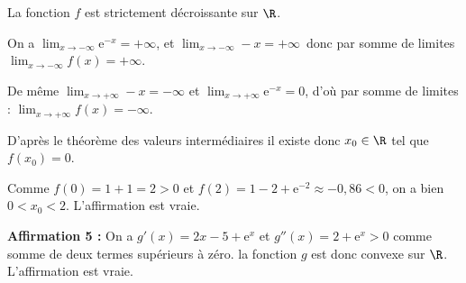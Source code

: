 La fonction $f$ est strictement décroissante sur $\R$.



On a $\displaystyle\lim_{x \to - \infty} \text{e}^{-x} = + \infty$, et $\displaystyle\lim_{x \to - \infty} - x = + \infty$\, donc par somme de limites  $\displaystyle\lim_{x \to - \infty} f(x) = + \infty$.

De même $\displaystyle\lim_{x \to + \infty} - x = - \infty$ et $\displaystyle\lim_{x \to + \infty} \text{e}^{- x} = 0$, d'où par somme de limites : $\displaystyle\lim_{x \to + \infty} f(x) = - \infty$.

D'après le théorème des valeurs intermédiaires il existe donc $x_0 \in \R$ tel que $f\left(x_0\right) = 0$.

Comme $f(0) = 1 + 1 = 2 > 0$ et $f(2) = 1 - 2 + \text{e}^{-2} \approx - 0,86 < 0$, on a bien $0 < x_0 < 2$. L'affirmation est vraie.
\smallskip

\textbf{Affirmation 5 :} 
On a $g'(x) = 2x - 5 + \text{e}^x$ et $g''(x) = 2 + \text{e}^x > 0$ comme somme de deux termes supérieurs à zéro. la fonction $g$ est donc convexe sur $\R$. L'affirmation est vraie.

\bigskip

